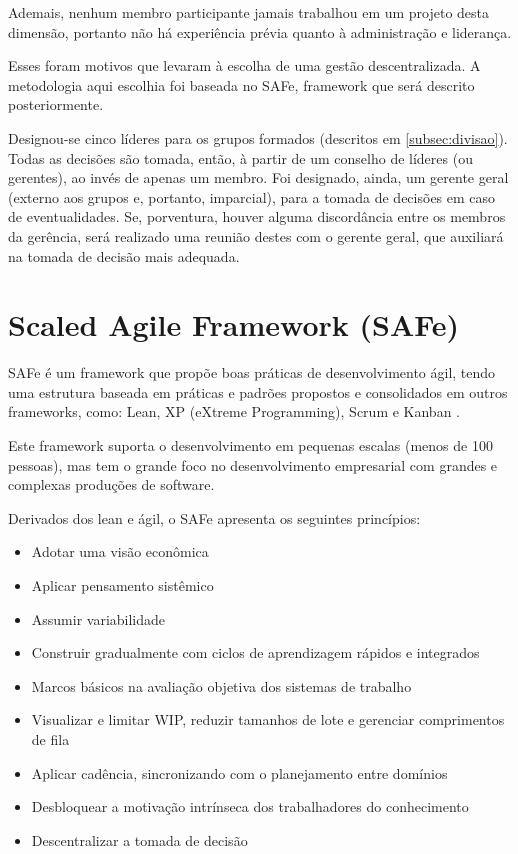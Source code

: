 Ademais, nenhum membro participante jamais trabalhou em um projeto desta dimensão, portanto não há experiência prévia quanto à administração e liderança.

Esses foram motivos que levaram à escolha de uma gestão descentralizada. A metodologia aqui escolhia foi baseada no SAFe, framework que será descrito posteriormente.

Designou-se cinco líderes para os grupos formados (descritos em \ref{subsec:divisao}). Todas as decisões são tomada, então, à partir de um conselho de líderes (ou gerentes), ao invés de apenas um membro. Foi designado, ainda, um gerente geral (externo aos grupos e, portanto, imparcial), para a tomada de decisões em caso de eventualidades. Se, porventura, houver alguma discordância entre os membros da gerência, será realizado uma reunião destes com o gerente geral, que auxiliará na tomada de decisão mais adequada.

\section{Scaled Agile Framework (SAFe)}
SAFe é um framework que propõe boas práticas de desenvolvimento ágil, tendo uma estrutura baseada em práticas e padrões
 propostos e consolidados em outros frameworks, como: Lean, XP (eXtreme Programming), Scrum e Kanban \cite{dasilva2016}.

Este framework suporta o desenvolvimento em pequenas escalas (menos de 100 pessoas), mas tem o grande foco no desenvolvimento
empresarial com grandes e complexas produções de software.

Derivados dos lean e ágil, o SAFe apresenta os seguintes princípios:
\begin{itemize}
 	\item Adotar uma visão econômica
 	\item Aplicar pensamento sistêmico
 	\item Assumir variabilidade
 	\item Construir gradualmente com ciclos de aprendizagem rápidos e integrados
	\item Marcos básicos na avaliação objetiva dos sistemas de trabalho
	\item Visualizar e limitar WIP, reduzir tamanhos de lote e gerenciar comprimentos de fila
	\item Aplicar cadência, sincronizando com o planejamento entre domínios
 	\item Desbloquear a motivação intrínseca dos trabalhadores do conhecimento
 	\item Descentralizar a tomada de decisão
\end{itemize}

